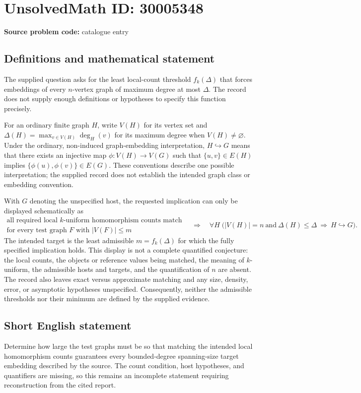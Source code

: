 \documentclass[11pt]{article}
\begin{document}
\section*{UnsolvedMath ID: 30005348}
\textbf{Source problem code:} catalogue entry
\subsection{Definitions and mathematical statement}
The supplied question asks for the least local-count threshold \(f_k(\Delta)\) that forces embeddings of every \(n\)-vertex graph of maximum degree at most \(\Delta\). The record does not supply enough definitions or hypotheses to specify this function precisely.

For an ordinary finite graph \(H\), write \(V(H)\) for its vertex set and \(\Delta(H)=\max_{v\in V(H)}\deg_H(v)\) for its maximum degree when \(V(H)\ne\varnothing\). Under the ordinary, non-induced graph-embedding interpretation, \(H\hookrightarrow G\) means that there exists an injective map \(\phi:V(H)\to V(G)\) such that \(\{u,v\}\in E(H)\) implies \(\{\phi(u),\phi(v)\}\in E(G)\). These conventions describe one possible interpretation; the supplied record does not establish the intended graph class or embedding convention.

With \(G\) denoting the unspecified host, the requested implication can only be displayed schematically as
\[
\begin{gathered}
\text{all required local \(k\)-uniform homomorphism counts match}\\
\text{for every test graph \(F\) with \(\lvert V(F)\rvert\le m\)}
\end{gathered}
\quad\Longrightarrow\quad
\forall H\;\bigl(\lvert V(H)\rvert=n\ \text{and}\ \Delta(H)\le\Delta
\ \Longrightarrow\ H\hookrightarrow G\bigr).
\]
The intended target is the least admissible \(m=f_k(\Delta)\) for which the fully specified implication holds. This display is not a complete quantified conjecture: the local counts, the objects or reference values being matched, the meaning of \(k\)-uniform, the admissible hosts and targets, and the quantification of \(n\) are absent. The record also leaves exact versus approximate matching and any size, density, error, or asymptotic hypotheses unspecified. Consequently, neither the admissible thresholds nor their minimum are defined by the supplied evidence.
\subsection{Short English statement}
Determine how large the test graphs must be so that matching the intended local homomorphism counts guarantees every bounded-degree spanning-size target embedding described by the source. The count condition, host hypotheses, and quantifiers are missing, so this remains an incomplete statement requiring reconstruction from the cited report.
\end{document}
